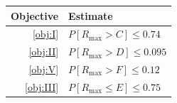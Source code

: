 \begin{tabularx}{\linewidth}{r>{\centering\arraybackslash}X}
\toprule  Objective & Estimate\\\midrule
  \ref{obj:I} & $P[R_{\max} > C] \le 0.74$\\\addlinespace
  \ref{obj:II} & $P[R_{\max} > D] \le 0.095$\\\addlinespace
  \ref{obj:V} & $P[R_{\max} > F] \le 0.12$\\\addlinespace
  \ref{obj:III} & $P[R_{\max} \le E] \le 0.75$\\\bottomrule
\end{tabularx}